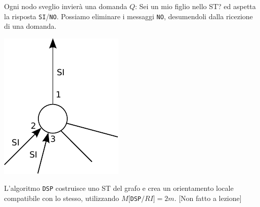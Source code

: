 Ogni nodo sveglio invierà una domanda $Q$: Sei un mio figlio nello ST? ed
aspetta la risposta \texttt{SI}/\texttt{NO}. Possiamo eliminare i messaggi
\texttt{NO}, desumendoli dalla ricezione di una domanda.


\begin{center}
    \includegraphics[scale=0.75]{capitoli/esplorazione-grafo-anonimo/imgs/n_32}
\end{center}

\begin{theorem}
    L'algoritmo \texttt{DSP} costruisce uno ST del grafo e crea un
    orientamento locale compatibile con lo stesso, utilizzando $M[$\texttt{DSP}$/
                RI] = 2m$. [Non fatto a lezione]
\end{theorem}

